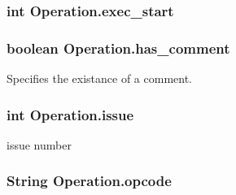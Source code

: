 \hypertarget{classOperation_a2dfe9cb6c6a10cb7f775036b6602bf7e}{
\subsubsection[{exec\-\_\-start}]{\setlength{\rightskip}{0pt plus 5cm}int {\bf \-Operation.\-exec\-\_\-start}}}\label{classOperation_a2dfe9cb6c6a10cb7f775036b6602bf7e}
\hypertarget{classOperation_ac3f08d5e96c77223a1fbfa68afb0d63a}{
\subsubsection[{has\-\_\-comment}]{\setlength{\rightskip}{0pt plus 5cm}boolean {\bf \-Operation.\-has\-\_\-comment}}}\label{classOperation_ac3f08d5e96c77223a1fbfa68afb0d63a}


\-Specifies the existance of a comment. 

\hypertarget{classOperation_af9f72f137e8122fecde6cb26ea01db5d}{
\subsubsection[{issue}]{\setlength{\rightskip}{0pt plus 5cm}int {\bf \-Operation.\-issue}}}\label{classOperation_af9f72f137e8122fecde6cb26ea01db5d}


issue number 

\hypertarget{classOperation_a91a69611ab1dd4ca12de1abdd49c2b42}{
\subsubsection[{opcode}]{\setlength{\rightskip}{0pt plus 5cm}\-String {\bf \-Operation.\-opcode}}}\label{classOperation_a91a69611ab1dd4ca12de1abdd49c2b42}


